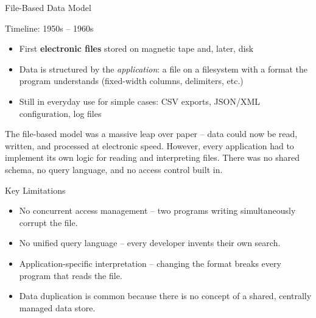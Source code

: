 \begin{frame}{File-Based Data Model}
  \begin{block}{Timeline: 1950s -- 1960s}
    \begin{itemize}
      \item First \textbf{electronic files} stored on magnetic tape and, later, disk
      \item Data is structured by the \emph{application}: a file on a filesystem
            with a format the program understands (fixed-width columns, delimiters, etc.)
      \item Still in everyday use for simple cases: CSV exports, JSON/XML configuration,
            log files
    \end{itemize}
  \end{block}

  The file-based model was a massive leap over paper -- data could now be read,
  written, and processed at electronic speed.  However, every application had
  to implement its own logic for reading and interpreting files.  There was no
  shared schema, no query language, and no access control built in.

  \begin{alertblock}{Key Limitations}
    \begin{itemize}
      \item No concurrent access management -- two programs writing simultaneously
            corrupt the file.
      \item No unified query language -- every developer invents their own search.
      \item Application-specific interpretation -- changing the format breaks
            every program that reads the file.
      \item Data duplication is common because there is no concept of a
            shared, centrally managed data store.
    \end{itemize}
  \end{alertblock}
\end{frame}

